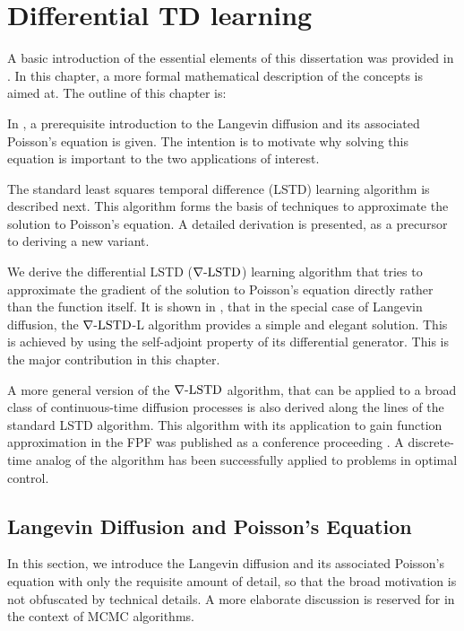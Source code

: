 \chapter{Differential TD learning} %
\label{ch:diff_td}
A basic introduction of the essential elements of this dissertation was provided in . In this chapter, a more formal mathematical description of the concepts is aimed at. The outline of this chapter is:
\begin{romannum}
\item In , a prerequisite introduction to the Langevin diffusion and its associated Poisson's equation is given. The intention is to motivate why solving this equation is important to the two applications of interest.
\item The standard least squares temporal difference (LSTD) learning algorithm is described next. This algorithm forms the basis of techniques to approximate the solution to Poisson's equation. A detailed derivation is presented, as a precursor to deriving a new variant.
\item We derive the differential LSTD ($\nabla\text{-LSTD}$) learning algorithm that tries to approximate the gradient of the solution to Poisson's equation directly rather than the function itself.
It is shown in , that in the special case of Langevin diffusion, the $\nabla\text{-LSTD}$-L algorithm provides a simple and elegant solution. This is achieved by using the self-adjoint property of its differential generator. This is the major contribution in this chapter. 
\item A more general version of the $\nabla\text{-LSTD}$ algorithm, that can be applied to a broad class of continuous-time diffusion processes is also derived along the lines of the standard LSTD algorithm. This algorithm with its application to gain function approximation in the FPF was published as a conference proceeding \cite{raddevmey16}. A discrete-time analog of the algorithm has been successfully applied to problems in optimal control. 
\end{romannum}

\section{Langevin Diffusion and Poisson's Equation}
\label{s:langevin_diffusion}
In this section, we introduce the Langevin diffusion and its associated Poisson's equation with only the requisite amount of detail, so that the broad motivation is not obfuscated by technical details. A more elaborate discussion is reserved for  in the context of MCMC algorithms. 

